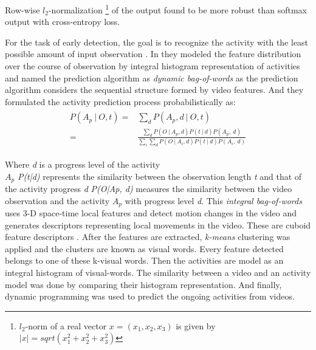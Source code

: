 \newpara Row-wise $\textit{l}_2$-normalization \footnote{$l_2$-norm of a real vector $x=(x_1,x_2,x_3)$ is given by $|x|=sqrt(x_1^2+x_2^2+x_3^2)$} of the output found to be more robust than softmax output with cross-entropy loss. %

For the task of early detection, the goal is to recognize the activity with the least possible amount of input observation \cite{ryoo2011human}. In \cite{ryoo2011human} they modeled the feature distribution over the course of observation by integral histogram representation of activities and named the prediction algorithm as \textit{dynamic bag-of-words} as the prediction algorithm considers the sequential structure formed by video features. And they formulated the activity prediction process probabilistically as:
\begin{align}
\begin{split}
		P(A_{p}\: |\: O,t) ={}& \displaystyle \sum_{d}  P(A_{p},d\: |\: O,t)\\
		={}&	\frac{\sum_{d} P(O\: | \: A_{p},d)P(t\: | \:d)P(A_{p},\: d)}
	 {\sum_{i}\sum_{d} P(O\: | \: A_{i},d)P(t\: | \:d)P(A_{i},\: d) }
\end{split}
\end{align}

\newpara Where \textit{d} is a progress level of the activity \\
\textit{$A_{p}$}  \textit{ P(t|d)} represents the similarity between the observation length \textit{t} and that of the activity progress \textit{d}
\textit{P(O|Ap, d)} measures the similarity between the video observation and the activity \textit{$A_{p}$} with progress level \textit{d}. This \textit{integral bag-of-words} uses 3-D space-time local features and detect motion changes in the video and generates descriptors representing local movements in the video. These are cuboid feature descriptors \cite{dollar2005behavior}. After the features are extracted, \textit{k-means} clustering was applied and the clusters are known as visual words. Every feature detected belongs to one of these k-visual words. Then the activities are model as an integral histogram of visual-words. The similarity between a video and an activity model was done by comparing their histogram representation. And finally, dynamic programming was used to predict the ongoing activities from videos.

